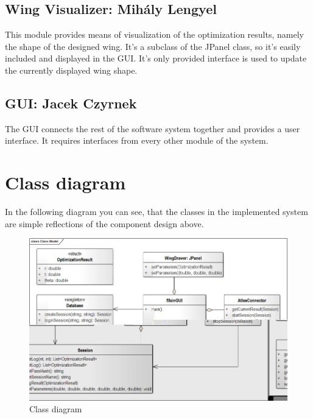 \documentclass[10pt,a4paper]{report}
\begin{document}
\subsection{Wing Visualizer: Mihály Lengyel}
This module provides means of visualization of the optimization results, namely the shape of the designed wing. It's a subclass of the JPanel class, so it's easily included and displayed in the GUI. It's only provided interface is used to update the currently displayed wing shape.
\subsection{GUI: Jacek Czyrnek}
The GUI connects the rest of the software system together and provides a user interface. It requires interfaces from every other module of the system.
\pagebreak

\section{Class diagram}
In the following diagram you can see, that the classes in the implemented system are simple reflections of the component design above.\\
\begin{figure}[h!]
\includegraphics[width=\textwidth]{ClassModel.jpg}
\caption{Class diagram}
\end{figure}
\pagebreak
\end{document}
